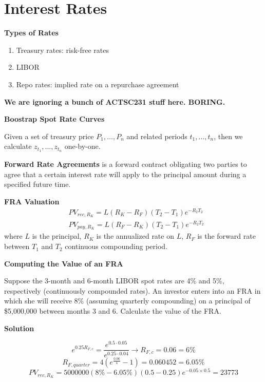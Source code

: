 \documentclass[11pt,fleqn]{book} %
\numberwithin{equation}{section} %
\numberwithin{figure}{section} %
\numberwithin{table}{section} %
\begin{document}
\chapter{Interest Rates}
\begin{definition}\textbf{Types of Rates}
\begin{enumerate}
    \item Treasury rates: risk-free rates
    \item LIBOR
    \item Repo rates: implied rate on a repurchase agreement
\end{enumerate}
\end{definition}
\begin{remark}\textbf{We are ignoring a bunch of ACTSC231 stuff here. BORING.}
\end{remark}
\begin{theorem}\textbf{Boostrap Spot Rate Curves}

Given a set of treasury price $P_1,\dots,P_n$ and related periods $t_1,\dots,t_n$, then we calculate $z_{t_1},\dots,z_{t_n}$ one-by-one.

\end{theorem}
\begin{definition}\textbf{Forward Rate Agreements} is a forward contract obligating two parties to agree that a certain interest rate will apply to the principal amount during a specified future time. 
\end{definition}
\begin{theorem}\textbf{FRA Valuation}
\begin{align*}
    &PV_{rec,R_K}=L(R_K-R_F)(T_2-T_1)e^{-R_2T_2}\\
    &PV_{pay,R_K}=L(R_F-R_K)(T_2-T_1)e^{-R_2T_2}
\end{align*}
where $L$ is the principal, $R_K$ is the annualized rate on $L$, $R_F$ is the forward rate between $T_1$ and $T_2$ continuous compounding period. 
\end{theorem}
\begin{exercise}\textbf{Computing the Value of an FRA}

Suppose the 3-month and 6-month LIBOR spot rates are 4\% and 5\%, respectively
(continuously compounded rates). An investor enters into an FRA in which she will
receive 8\% (assuming quarterly compounding) on a principal of \$5,000,000 between
months 3 and 6. Calculate the value of the FRA.

\textbf{Solution}

$$
e^{0.25R_{F,c}}=\frac{e^{0.5\cdot 0.05}}{e^{0.25\cdot 0.04}}\to R_{F,c}=0.06=6\%
$$
$$
R_{F,quarter}=4\left(e^{\frac{0.06}{4}}-1\right)=0.060452=6.05\%
$$
$$
PV_{rec,R_K}=5000000(8\%-6.05\%)(0.5-0.25)e^{-0.05\times 0.5}=23773
$$
\end{exercise}
\end{document}
